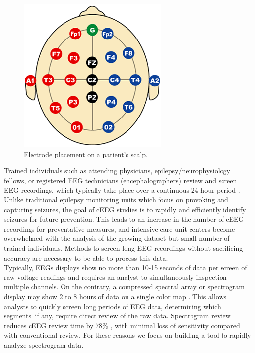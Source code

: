 \begin{figure}[h]
\begin{center}
\includegraphics[scale=0.5]{./img/electrodes.png}
\caption{Electrode placement on a patient's scalp.}
\label{fig:electrodes}
\end{center}
\end{figure}

Trained individuals such as attending physicians, epilepsy/neurophysiology
fellows, or registered EEG technicians (encephalographers) review and screen
EEG recordings, which typically take place over a continuous 24-hour period
\cite{ceeg-3}.  Unlike traditional epilepsy monitoring units which focus on
provoking and capturing seizures, the goal of cEEG studies is to rapidly and
efficiently identify seizures for future prevention. This leads to an increase
in the number of cEEG recordings for preventative measures, and intensive care
unit centers become overwhelmed with the analysis of the growing dataset but
small number of trained individuals. Methods to screen long EEG recordings
without sacrificing accuracy are necessary to be able to process this data. \\

Typically, EEGs displays show no more than 10-15 seconds of data per screen of
raw voltage readings and requires an analyst to simultaneously inspection
multiple channels. On the contrary, a compressed spectral array \cite{csa} or
spectrogram display may show 2 to 8 hours of data on a single color map
\cite{ceeg-3}. This allows analysts to quickly screen long periods of EEG data,
determining which segments, if any, require direct review of the raw data.
Spectrogram review reduces cEEG review time by $78\%$ \cite{ceeg-2}, with
minimal loss of sensitivity compared with conventional review. For these
reasons we focus on building a tool to rapidly analyze spectrogram data. \\

